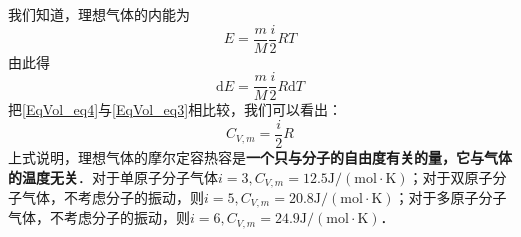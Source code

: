 我们知道，理想气体的内能为
\begin{equation}
E=\frac{m}{M} \frac{i}{2} R T
\end{equation}
由此得
\begin{equation} \label{EqVol_eq4}
\mathrm{d} E=\frac{m}{M} \frac{i}{2} R \mathrm{d} T
\end{equation}
把\autoref{EqVol_eq4}与\autoref{EqVol_eq3}相比较，我们可以看出：
\begin{equation}
C_{V, m}=\frac{i}{2} R
\end{equation}
上式说明，理想气体的摩尔定容热容是\textbf{一个只与分子的自由度有关的量，它与气体的温度无关}．对于单原子分子气体$i=3, C_{V, m}=12.5 \mathrm{J} /(\mathrm{mol} \cdot \mathrm{K})$；对于双原子分子气体，不考虑分子的振动，则$i=5, C_{V, {m}}=20.8 \mathrm{J} /(\mathrm{mol} \cdot \mathrm{K})$；对于多原子分子气体，不考虑分子的振动，则$i=6, C_{V, {m}}=24.9 \mathrm{J} /(\mathrm{mol} \cdot \mathrm{K})$．